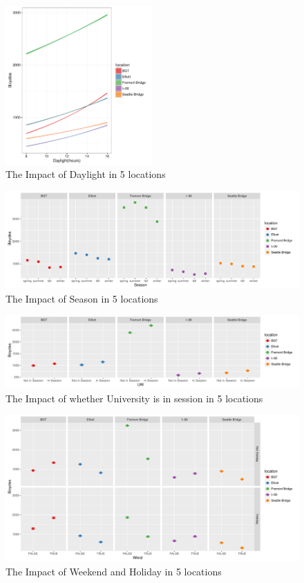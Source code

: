 \documentclass [11pt, proquest] {uwthesis}[2015/03/03]
\begin{document}
\begin{figure}
  \centering
  \includegraphics[width=0.5\textwidth]{figures/5sites/Sim_daylight} 
 \caption{The Impact of Daylight in 5 locations }
 \label{fig:Sim_daylight}
\end{figure}

\begin{figure}
  \includegraphics[width=1\textwidth]{figures/5sites/Sim_season} 
 \caption{The Impact of Season in 5 locations }
 \label{fig:Sim_season}
\end{figure}

\begin{figure}
  \includegraphics[width=1\textwidth]{figures/5sites/Sim_UW} 
 \caption{The Impact of whether University is in session in 5 locations }
 \label{fig:Sim_UW}
\end{figure}

\begin{figure}
  \includegraphics[width=1\textwidth]{figures/5sites/Sim_wknd} 
 \caption{The Impact of Weekend and Holiday in 5 locations}
 \label{fig:Sim_wknd}
\end{figure}
\end{document}
